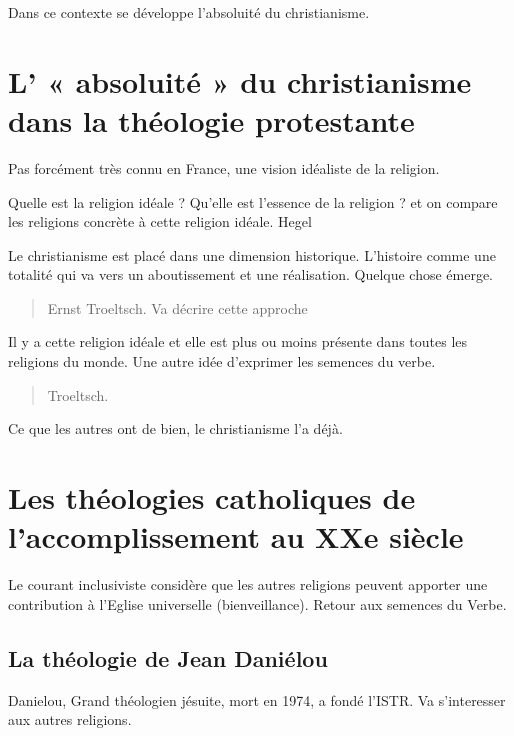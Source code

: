     Dans ce contexte se développe l'absoluité du christianisme.


  \section{L' « absoluité » du christianisme dans la théologie
  protestante} 
 
 Pas forcément très connu en France, une vision idéaliste de la religion.  
 \begin{Def}[absoluité]
  Quelle est la religion idéale ? Qu'elle est l'essence de la religion ? et on compare les religions concrète à cette religion idéale. Hegel
 \end{Def}
  Le christianisme est placé dans une dimension historique.
  L'histoire comme une totalité qui va vers un aboutissement et une réalisation. Quelque chose émerge. 
  \begin{quote}
      Ernst Troeltsch. Va décrire cette approche
  \end{quote}
  Il y a cette religion idéale et elle est plus ou moins présente dans toutes les religions du monde. Une autre idée d'exprimer les semences du verbe. 
  
  
  \begin{quote}
      Troeltsch. 
  \end{quote}
  Ce que les autres ont de bien, le christianisme l'a déjà.
  
  
  \section{Les théologies catholiques de l'accomplissement au XXe siècle}
  
Le courant inclusiviste considère que les autres religions peuvent apporter une contribution à l'Eglise universelle (bienveillance). Retour aux semences du Verbe.


   
    
    \subsection{La théologie de Jean Daniélou}
    
Danielou, Grand théologien jésuite, mort en 1974, a fondé l'ISTR. Va s'interesser aux autres religions. 
  

     
      
